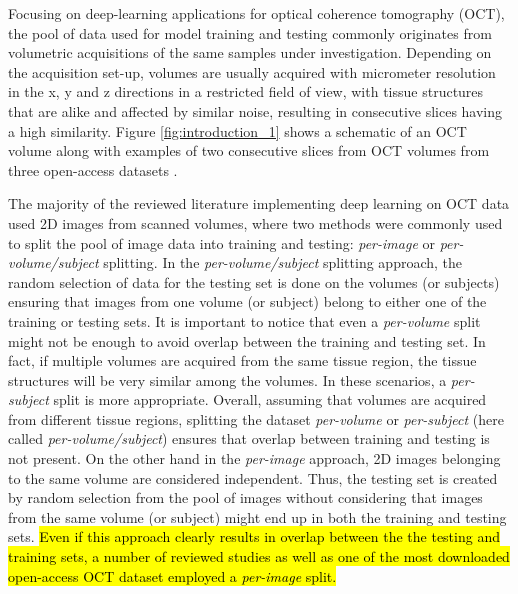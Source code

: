 \documentclass[fleqn,10pt]{wlscirep}
\begin{document}
Focusing on deep-learning applications for optical coherence tomography (OCT), the pool of data used for model training and testing commonly originates from volumetric acquisitions of the same samples under investigation. Depending on the acquisition set-up, volumes are usually acquired with micrometer resolution in the x, y and z directions in a restricted field of view, with tissue structures that are alike and affected by similar noise, resulting in consecutive slices having a high similarity. Figure \ref{fig:introduction_1} shows a schematic of an OCT volume along with examples of two consecutive slices from OCT volumes from three open-access datasets \cite{butola2019volumetric, kermany2018large}. 

The majority of the reviewed literature implementing deep learning on OCT data used 2D images from scanned volumes, where two methods were commonly used to split the pool of image data into training and testing: \textit{per-image} or \textit{per-volume/subject} splitting. 
In the \textit{per-volume/subject} splitting approach,  the random selection of data for the testing set is done on the volumes (or subjects) ensuring that images from one volume (or subject) belong to either one of the training or testing sets. It is important to notice that even a \textit{per-volume} split might not be enough to avoid overlap between the training and testing set. In fact, if multiple volumes are acquired from the same tissue region, the tissue structures will be very similar among the volumes. In these scenarios, a \textit{per-subject} split is more appropriate. Overall, assuming that volumes are acquired from different tissue regions, splitting the dataset \textit{per-volume} or \textit{per-subject} (here called \textit{per-volume/subject}) ensures that overlap between training and testing is not present.
On the other hand in the \textit{per-image} approach, 2D images belonging to the same volume are considered independent. Thus, the testing set is created by random selection from the pool of images without considering that images from the same volume (or subject) might end up in both the training and testing sets.  \hl{Even if this approach clearly results in overlap between the the testing and training sets,  a number of reviewed studies as well as one of the most downloaded open-access OCT dataset employed a \textit{per-image} split.} 

\end{document}
